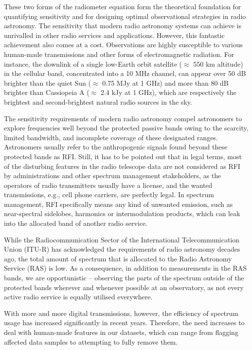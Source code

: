 These two forms of the radiometer equation form the theoretical foundation for quantifying sensitivity and for designing optimal observational strategies in radio astronomy. The sensitivity that modern radio astronomy systems can achieve is unrivalled in other radio services and applications. However, this fantastic achievement also comes at a cost. Observations are highly susceptible to various human-made transmissions and other forms of electromagnetic radiation.
For instance, the downlink of a single low-Earth orbit satellite ($\approx$ 550 km altitude) in the cellular band, concentrated into a 10 MHz channel, can appear over 50 dB brighter than the quiet Sun ($\approx$ 0.75 MJy at 1 GHz) and more than 80 dB brighter than Cassiopeia A ($\approx$ 2.4 kJy at 1 GHz), which are respectively the brightest and second-brightest natural radio sources in the sky.

The sensitivity requirements of modern radio astronomy compel astronomers to explore frequencies well beyond the protected passive bands owing to the scarcity, limited bandwidth, and incomplete coverage of these designated ranges. Astronomers usually refer to the anthropogenic signals found beyond these protected bands as RFI. Still, it has to be pointed out that in legal terms, most of the disturbing features in the radio telescope data are not considered as RFI by administrations and other spectrum management stakeholders, as the operators of radio transmitters usually have a license, and the wanted transmissions, e.g., cell phone carriers, are perfectly legal. In spectrum management, RFI specifically means any kind of unwanted emission, such as near-spectral sidelobes, harmonics or intermodulation products, which can leak into the allocated band of another radio service.

While the Radiocommunication Sector of the International Telecommunication Union (ITU-R) has acknowledged the requirements of radio astronomy decades ago, the total amount of spectrum that is allocated to the Radio Astronomy Service (RAS) is low. As a consequence, in addition to measurements in the RAS bands, we are opportunistic -- observing the parts of the spectrum outside of the protected bands wherever and whenever possible at an observatory, as not every active radio service is equally utilised everywhere. 

With more and more digital transmissions, however, the efficiency of spectrum usage has increased significantly in recent years. Therefore, the need increases to deal with human-made features in our datasets, which can range from flagging affected data samples to attempting to fully remove them.

